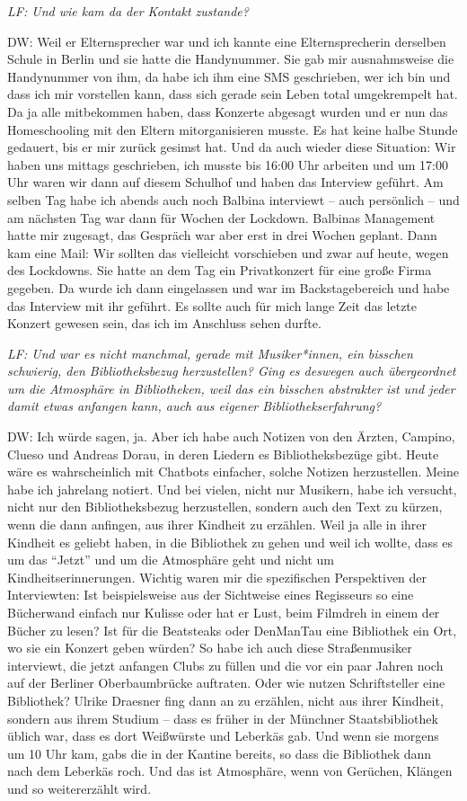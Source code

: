 \documentclass[a4paper,
fontsize=11pt,
oneside,
numbers=noperiodatend,
parskip=half-,
bibliography=totoc,
final
]{scrartcl}
\begin{document}
\emph{LF: Und wie kam da der Kontakt zustande?}

DW: Weil er Elternsprecher war und ich kannte eine Elternsprecherin
derselben Schule in Berlin und sie hatte die Handynummer. Sie gab mir
ausnahmsweise die Handynummer von ihm, da habe ich ihm eine SMS
geschrieben, wer ich bin und dass ich mir vorstellen kann, dass sich
gerade sein Leben total umgekrempelt hat. Da ja alle mitbekommen haben,
dass Konzerte abgesagt wurden und er nun das Homeschooling mit den
Eltern mitorganisieren musste. Es hat keine halbe Stunde gedauert, bis
er mir zurück gesimst hat. Und da auch wieder diese Situation: Wir haben
uns mittags geschrieben, ich musste bis 16:00 Uhr arbeiten und um 17:00
Uhr waren wir dann auf diesem Schulhof und haben das Interview geführt.
Am selben Tag habe ich abends auch noch Balbina interviewt -- auch
persönlich -- und am nächsten Tag war dann für Wochen der Lockdown.
Balbinas Management hatte mir zugesagt, das Gespräch war aber erst in
drei Wochen geplant. Dann kam eine Mail: Wir sollten das vielleicht
vorschieben und zwar auf heute, wegen des Lockdowns. Sie hatte an dem
Tag ein Privatkonzert für eine große Firma gegeben. Da wurde ich dann
eingelassen und war im Backstagebereich und habe das Interview mit ihr
geführt. Es sollte auch für mich lange Zeit das letzte Konzert gewesen
sein, das ich im Anschluss sehen durfte.

\emph{LF: Und war es nicht manchmal, gerade mit Musiker*innen, ein
bisschen schwierig, den Bibliotheksbezug herzustellen? Ging es deswegen
auch übergeordnet um die Atmosphäre in Bibliotheken, weil das ein
bisschen abstrakter ist und jeder damit etwas anfangen kann, auch aus
eigener Bibliothekserfahrung?}

DW: Ich würde sagen, ja. Aber ich habe auch Notizen von den Ärzten,
Campino, Clueso und Andreas Dorau, in deren Liedern es Bibliotheksbezüge
gibt. Heute wäre es wahrscheinlich mit Chatbots einfacher, solche
Notizen herzustellen. Meine habe ich jahrelang notiert. Und bei vielen,
nicht nur Musikern, habe ich versucht, nicht nur den Bibliotheksbezug
herzustellen, sondern auch den Text zu kürzen, wenn die dann anfingen,
aus ihrer Kindheit zu erzählen. Weil ja alle in ihrer Kindheit es
geliebt haben, in die Bibliothek zu gehen und weil ich wollte, dass es
um das \enquote{Jetzt} und um die Atmosphäre geht und nicht um
Kindheitserinnerungen. Wichtig waren mir die spezifischen Perspektiven
der Interviewten: Ist beispielsweise aus der Sichtweise eines Regisseurs
so eine Bücherwand einfach nur Kulisse oder hat er Lust, beim Filmdreh
in einem der Bücher zu lesen? Ist für die Beatsteaks oder DenManTau eine
Bibliothek ein Ort, wo sie ein Konzert geben würden? So habe ich auch
diese Straßenmusiker interviewt, die jetzt anfangen Clubs zu füllen und
die vor ein paar Jahren noch auf der Berliner Oberbaumbrücke auftraten.
Oder wie nutzen Schriftsteller eine Bibliothek? Ulrike Draesner fing
dann an zu erzählen, nicht aus ihrer Kindheit, sondern aus ihrem Studium
-- dass es früher in der Münchner Staatsbibliothek üblich war, dass es
dort Weißwürste und Leberkäs gab. Und wenn sie morgens um 10 Uhr kam,
gab\textquotesingle s die in der Kantine bereits, so dass die Bibliothek
dann nach dem Leberkäs roch. Und das ist Atmosphäre, wenn von Gerüchen,
Klängen und so weitererzählt wird.
\end{document}
